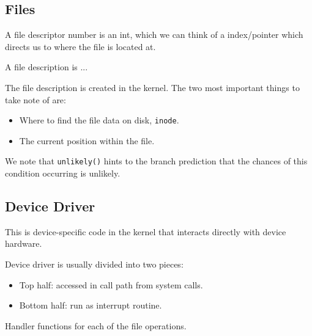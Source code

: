 \documentclass[openany]{book}
\begin{document}
\subsection{Files}
\begin{defn}
	A file descriptor number is an int, which we can think of a index/pointer which directs us to where the file is located at.
\end{defn}

\begin{defn}
	A file description is ...
\end{defn}
The file description is created in the kernel. The two most important things to take note of are:
\begin{itemize}
	\item Where to find the file data on disk, \texttt{inode}.
	\item The current position within the file.
\end{itemize}

\begin{rmk}
	We note that \texttt{unlikely()} hints to the branch prediction that the chances of this condition occurring is unlikely.
\end{rmk}

\subsection{Device Driver}
\begin{defn}
	This is device-specific code in the kernel that interacts directly with device hardware.
\end{defn}

Device driver is usually divided into two pieces:
\begin{itemize}
	\item Top half: accessed in call path from system calls.
	\item Bottom half: run as interrupt routine.
\end{itemize}

Handler functions for each of the file operations.
\end{document}
